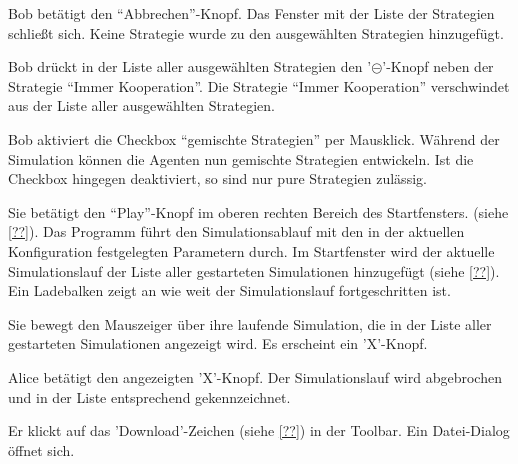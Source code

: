 \documentclass[parskip=full,11pt]{scrartcl}
\begin{document}
{Bob betätigt den \enquote{Abbrechen}-Knopf.}
{Das Fenster mit der Liste der Strategien schließt sich. Keine Strategie wurde zu den ausgewählten Strategien hinzugefügt.}

{Bob drückt in der Liste aller ausgewählten Strategien den '\(\circleddash\)'-Knopf neben der Strategie \enquote{Immer Kooperation}.}
{Die Strategie \enquote{Immer Kooperation} verschwindet aus der Liste aller ausgewählten Strategien.}

{Bob aktiviert die Checkbox \enquote{gemischte Strategien} per Mausklick.}
{Während der Simulation können die Agenten nun gemischte Strategien entwickeln. Ist die Checkbox hingegen deaktiviert, so sind nur pure Strategien zulässig.}


{Sie betätigt den \enquote{Play}-Knopf im oberen rechten Bereich des Startfensters. (siehe \cref{??}).}
{Das Programm führt den Simulationsablauf mit den in der aktuellen Konfiguration festgelegten Parametern durch. Im Startfenster wird der aktuelle Simulationslauf der Liste aller gestarteten Simulationen hinzugefügt (siehe \cref{??}). Ein Ladebalken zeigt an wie weit der Simulationslauf fortgeschritten ist.}

{Sie bewegt den Mauszeiger über ihre laufende Simulation, die in der Liste aller gestarteten Simulationen angezeigt wird.}
{Es erscheint ein 'X'-Knopf.}

{Alice betätigt den angezeigten 'X'-Knopf.}
{Der Simulationslauf wird abgebrochen und in der Liste entsprechend gekennzeichnet.}


{Er klickt auf das 'Download'-Zeichen (siehe \cref{??}) in der Toolbar.}
{Ein Datei-Dialog öffnet sich.}
\end{document}
